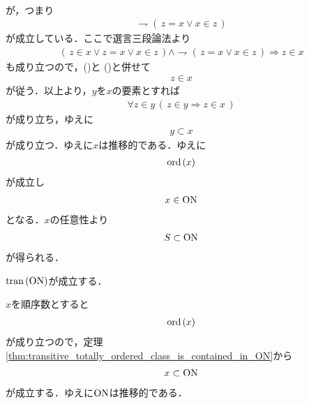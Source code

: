 \begin{sketch}
\begin{description}
\begin{align}
		\end{align}
		が，つまり
		\begin{align}
			\rightharpoondown (\, z = x \vee x \in z\, )
			\label{fom:thm_transitive_totally_ordered_class_is_contained_in_ON_4}
		\end{align}
		が成立している．ここで選言三段論法より
		\begin{align}
			(\, z \in x \vee z = x \vee x \in z\, ) \wedge 
			\rightharpoondown (\, z = x \vee x \in z\, )
			\Longrightarrow z \in x
		\end{align}
		も成り立つので，()と
		()と併せて
		\begin{align}
			z \in x
		\end{align}
		が従う．以上より，$y$を$x$の要素とすれば
		\begin{align}
			\forall z \in y\, (\, z \in y \Longrightarrow z \in x\, )
		\end{align}
		が成り立ち，ゆえに
		\begin{align}
			y \subset x
		\end{align}
		が成り立つ．ゆえに$x$は推移的である．ゆえに
		\begin{align}
			\operatorname*{ord}\hspace{0.15em}(x)
		\end{align}
		が成立し
		\begin{align}
			x \in \mathrm{ON}
		\end{align}
		となる．$x$の任意性より
		\begin{align}
			S \subset \mathrm{ON}
		\end{align}
		が得られる．
		\QED
		\end{description}
	\end{sketch}
	
	\begin{screen}
		\begin{thm}[$\ON$は推移的]\label{thm:On_is_transitive}
			$\operatorname*{tran}\hspace{0.15em}(\mathrm{ON})$が成立する．
		\end{thm}
	\end{screen}
	
	\begin{prf} 
		$x$を順序数とすると
		\begin{align}
			\operatorname*{ord}\hspace{0.15em}(x)
		\end{align}
		が成り立つので，定理\ref{thm:transitive_totally_ordered_class_is_contained_in_ON}から
		\begin{align}
			x \subset \mathrm{ON}
		\end{align}
		が成立する．ゆえに$\ON$は推移的である．
		\QED
	\end{prf}
	
